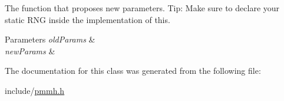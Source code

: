The function that proposes new parameters. Tip\+: Make sure to declare your static R\+NG inside the implementation of this. 


\begin{DoxyParams}{Parameters}
{\em old\+Params} & \\
\hline
{\em new\+Params} & \\
\hline
\end{DoxyParams}


The documentation for this class was generated from the following file\+:\begin{DoxyCompactItemize}
\item 
include/\hyperlink{pmmh_8h}{pmmh.\+h}\end{DoxyCompactItemize}
